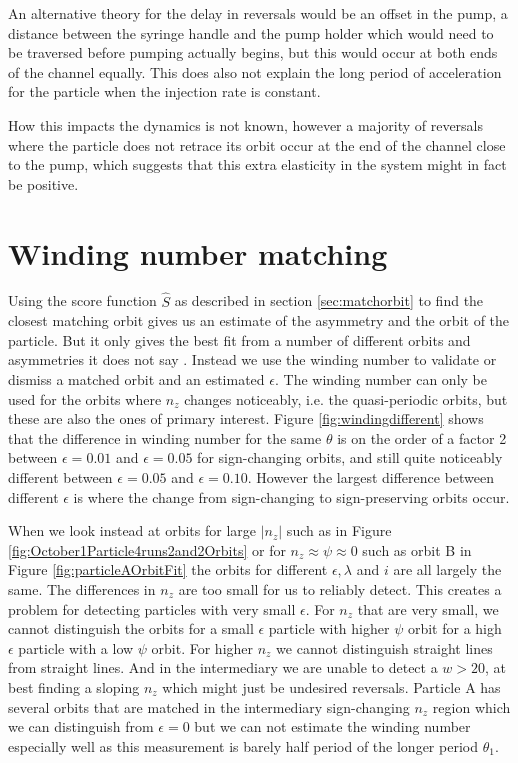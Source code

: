An alternative theory for the delay in reversals would be an offset in the pump, a distance between the syringe handle and the pump holder which would need to be traversed before pumping actually begins, but this would occur at both ends of the channel equally. This does also not explain the long period of acceleration for the particle when the injection rate is constant.

How this impacts the dynamics is not known, however a majority of reversals where the particle does not retrace its orbit occur at the end of the channel close to the pump, which suggests that this extra elasticity in the system might in fact be positive. 

\section{Winding number matching}
Using the score function $\hat{S}$ as described in section \ref{sec:matchorbit} to find the closest matching orbit gives us an estimate of the asymmetry and the orbit of the particle. But it only gives the best fit from a number of different orbits and asymmetries it does not say .  Instead we use the winding number to validate or dismiss a matched orbit and an estimated $\epsilon$. The winding number can only be used for the orbits where $n_z$ changes noticeably, i.e. the quasi-periodic orbits, but these are also the ones of primary interest. 
Figure \ref{fig:windingdifferent} shows that the difference in winding number for the 
same $\theta$ is on the order of a factor 2 between $\epsilon = 0.01$ and $\epsilon = 0.05$ for sign-changing orbits, and 
still quite noticeably different between $\epsilon = 0.05$ and $\epsilon = 0.10$. However the largest difference between different $\epsilon$ is where the change from sign-changing to sign-preserving orbits occur. 

When we look instead at orbits for large $\left| n_z \right|$ such as in Figure 
\ref{fig:October1Particle4runs2and2Orbits} or for $n_z \approx \psi \approx 0$ such as orbit B in Figure 
\ref{fig:particleAOrbitFit} the orbits for different $\epsilon, \lambda$ 
and $i$ are all largely the same. The differences in $n_z$ are too small for us to reliably detect. This creates a problem for 
detecting particles with very small $\epsilon$. For $n_z$ that are very small, we cannot distinguish the orbits for a 
small $\epsilon$ particle with higher $\psi$ orbit for a high $\epsilon$ particle with a low $\psi$ orbit. For higher 
$n_z$ we cannot distinguish straight lines from straight lines. And in the intermediary we are unable to detect a $w 
> 20$, at best finding a sloping $n_z$ which might just be undesired reversals. Particle A has several orbits that 
are matched in the intermediary sign-changing $n_z$ region which we can distinguish from $\epsilon = 0$ but we can not 
estimate the winding number especially well as this measurement is barely half period of the longer period $\theta_1$. 


